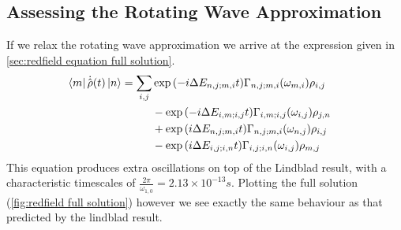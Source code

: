 \subsection{Assessing the Rotating Wave Approximation}
If we relax the rotating wave approximation
we arrive at the expression given in \cref{sec:redfield equation full solution}.
\begin{align}
    \bra{m}\dot{\hat{\rho{}}}(t) \ket{n} & = \begin{aligned}[t]
        \sum_{i,j} &
        \exp{(-i\Delta{}E_{n,j;m,i} t)}
        \Gamma_{n,j;m, i}(\omega_{m,i})
        \rho_{i,j}   \\
                   &
        -\exp{(-i\Delta{}E_{i,m;i,j} t)}
        \Gamma_{i,m;i, j}(\omega_{i,j})
        \rho_{j, n}  \\
                   &
        +\exp{(i\Delta{}E_{n,j;m,i} t)}
        \Gamma_{n,j; m, i}(\omega_{n,j})
        \rho_{i, j}  \\
                   &
        -\exp{(i\Delta{}E_{i,j;i,n} t)}
        \Gamma_{i,j; i, n}(\omega_{i,j})
        \rho_{m, j}
    \end{aligned}
\end{align}
This equation produces extra oscillations
on top of the Lindblad result, with
a characteristic timescales of
\(\frac{2\pi}{\omega_{1,0}} = 2.13\times{}10^{-13}s\). Plotting
the full solution (\cref{fig:redfield full solution})
however we see exactly the same behaviour as that
predicted by the lindblad result.
